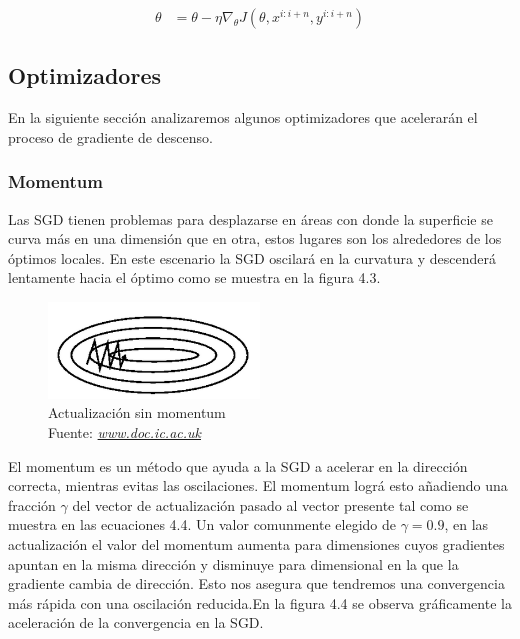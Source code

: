 \begin{equation}
\label{mbgds}
\begin{aligned}
\theta &= \theta - \eta \nabla_{\theta} J(\theta,x^{i:i+n},y^{i:i+n})
\end{aligned}
\end{equation}



\subsection{Optimizadores}
En la siguiente sección analizaremos algunos optimizadores que acelerarán el proceso de gradiente de descenso.
\subsubsection{Momentum}
Las SGD tienen problemas para desplazarse en áreas con donde la superficie se curva más en una dimensión que en otra, estos lugares son los alrededores de los óptimos locales. En este escenario la SGD oscilará en la curvatura y descenderá lentamente hacia el óptimo como se muestra en la figura 4.3.
\begin{figure}[H]
	\centering
	\includegraphics[width=0.5\textwidth]{Figures/momentum1.png}
	\caption{Actualización sin momentum \\ Fuente:  \href{https://www.doc.ic.ac.uk/~js4416/163/website/neural-networks/optimisers.html}{\textit{www.doc.ic.ac.uk}}}
	\label{momentum1}
\end{figure}
El momentum es un método que ayuda a la SGD a acelerar en la dirección correcta, mientras evitas las oscilaciones. El momentum lográ esto añadiendo una fracción $\gamma$ del vector de actualización pasado al vector presente tal como se muestra en las ecuaciones 4.4. Un valor comunmente elegido de $\gamma =0.9 $, en las actualización el valor del momentum aumenta para dimensiones cuyos gradientes apuntan en la misma dirección y disminuye para dimensional en la que la gradiente cambia de dirección. Esto nos asegura que tendremos una convergencia más rápida con una oscilación reducida.En la figura 4.4 se observa gráficamente la aceleración de la convergencia en la SGD.


